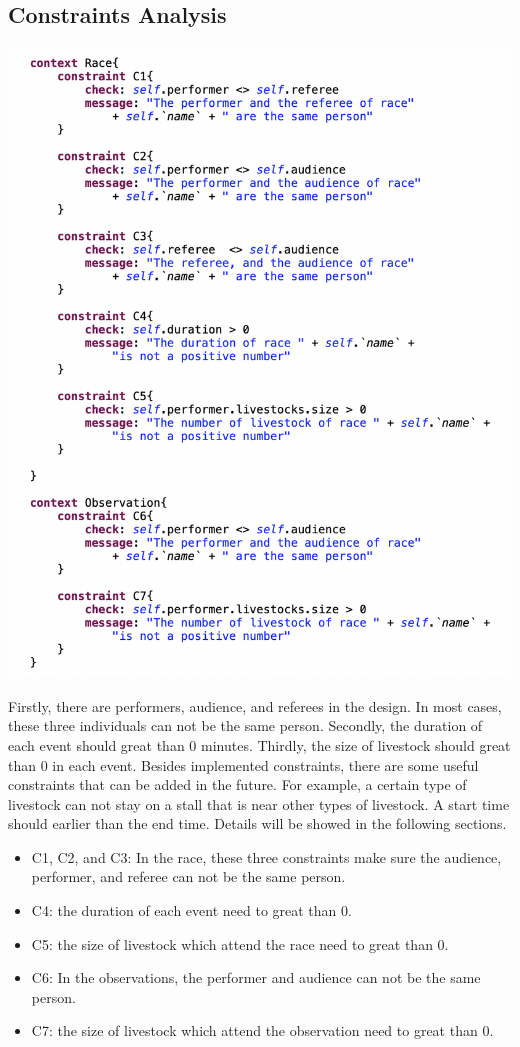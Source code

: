 \documentclass[12pt]{article}
\begin{document}
\subsection{Constraints Analysis}
\includegraphics[scale = 0.6]{img/evl-constraints}

Firstly, there are performers, audience, and referees in the design. In most cases, these three individuals can not be the same person. 
Secondly, the duration of each event should great than 0 minutes. Thirdly, the size of livestock should great than 0 in each 
event. Besides implemented constraints, there are some useful constraints that can be added in the future. For example, a certain type of livestock 
can not stay on a stall that is near other types of livestock. A start time should earlier than the end time. Details will be showed 
in the following sections.

\begin{itemize}
    \item C1, C2, and C3: In the race, these three constraints make sure the audience, performer, 
    and referee can not be the same person.
    \item C4: the duration of each event need to great than 0.
    \item C5: the size of livestock which attend the race need to great than 0.
    \item C6: In the observations, the performer and audience can not be the same person.
    \item C7: the size of livestock which attend the observation need to great than 0.
\end{itemize}
\end{document}

